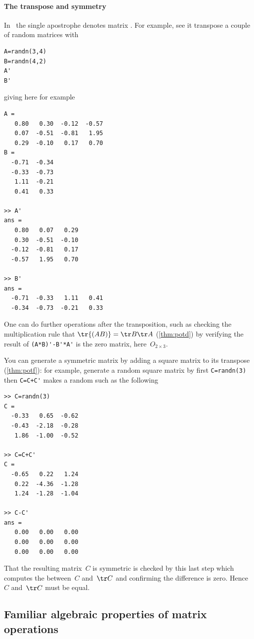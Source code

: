 \paragraph{The transpose and symmetry}
In \script\ the single apostrophe denotes matrix .
For example, see it transpose a couple of random matrices with
\begin{verbatim}
A=randn(3,4)
B=randn(4,2)
A'
B'
\end{verbatim}
\setbox\ajrqrbox\hbox{}%
\marginajrbox%
giving here for example \twodp
\begin{verbatim}
A =
   0.80   0.30  -0.12  -0.57
   0.07  -0.51  -0.81   1.95
   0.29  -0.10   0.17   0.70
B =
  -0.71  -0.34
  -0.33  -0.73
   1.11  -0.21
   0.41   0.33

>> A'
ans =
   0.80   0.07   0.29
   0.30  -0.51  -0.10
  -0.12  -0.81   0.17
  -0.57   1.95   0.70

>> B'
ans =
  -0.71  -0.33   1.11   0.41
  -0.34  -0.73  -0.21   0.33
\end{verbatim}
One can do further operations after the transposition, such as checking the multiplication rule that \(\tr{(AB)}=\tr B\tr A\) (\autoref{thm:potd}) by verifying the result of \verb|(A*B)'-B'*A'| is the zero matrix, here~\(O_{2\times3}\).

You can generate a symmetric matrix by adding a square matrix to its transpose (\autoref{thm:potf}): for example, generate a random square matrix by first \verb|C=randn(3)| then \verb|C=C+C'| makes a random  such as the following \twodp
\begin{verbatim}
>> C=randn(3)
C =
  -0.33   0.65  -0.62
  -0.43  -2.18  -0.28
   1.86  -1.00  -0.52

>> C=C+C'
C =
  -0.65   0.22   1.24
   0.22  -4.36  -1.28
   1.24  -1.28  -1.04

>> C-C'
ans =
   0.00   0.00   0.00
   0.00   0.00   0.00
   0.00   0.00   0.00
\end{verbatim}
That the resulting matrix~\(C\) is symmetric is checked by this last step which computes the  between~\(C\) and~\(\tr C\) and confirming the difference is zero. 
Hence \(C\) and~\(\tr C\) must be equal.






\subsection{Familiar algebraic properties of matrix operations}
\label{sec:fapmo}

